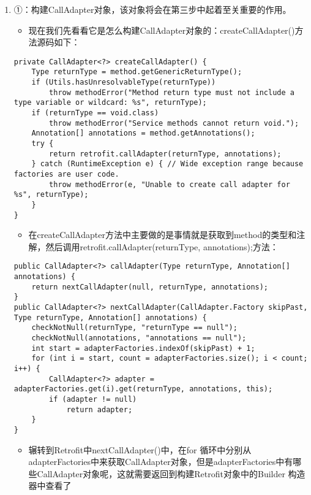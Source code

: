 \documentclass[9pt, b5paper]{article}
\begin{document}
\begin{enumerate}
\item ①：构建CallAdapter对象，该对象将会在第三步中起着至关重要的作用。
\label{sec-1-3-1-1}
\begin{itemize}
\item 现在我们先看看它是怎么构建CallAdapter对象的：createCallAdapter()方法源码如下：
\end{itemize}
\begin{verbatim}
private CallAdapter<?> createCallAdapter() {
    Type returnType = method.getGenericReturnType();
    if (Utils.hasUnresolvableType(returnType)) 
        throw methodError("Method return type must not include a type variable or wildcard: %s", returnType);
    if (returnType == void.class) 
        throw methodError("Service methods cannot return void.");
    Annotation[] annotations = method.getAnnotations();
    try {
        return retrofit.callAdapter(returnType, annotations);
    } catch (RuntimeException e) { // Wide exception range because factories are user code.
        throw methodError(e, "Unable to create call adapter for %s", returnType);
    }
}
\end{verbatim}
\begin{itemize}
\item 在createCallAdapter方法中主要做的是事情就是获取到method的类型和注解，然后调用retrofit.callAdapter(returnType, annotations);方法：
\end{itemize}
\begin{verbatim}
public CallAdapter<?> callAdapter(Type returnType, Annotation[] annotations) {
    return nextCallAdapter(null, returnType, annotations);
}
public CallAdapter<?> nextCallAdapter(CallAdapter.Factory skipPast, Type returnType, Annotation[] annotations) {
    checkNotNull(returnType, "returnType == null");
    checkNotNull(annotations, "annotations == null");
    int start = adapterFactories.indexOf(skipPast) + 1;
    for (int i = start, count = adapterFactories.size(); i < count; i++) {
        CallAdapter<?> adapter = adapterFactories.get(i).get(returnType, annotations, this);
        if (adapter != null) 
            return adapter;
    }
}
\end{verbatim}
\begin{itemize}
\item 辗转到Retrofit中nextCallAdapter()中，在for 循环中分别从adapterFactories中来获取CallAdapter对象，但是adapterFactories中有哪些CallAdapter对象呢，这就需要返回到构建Retrofit对象中的Builder 构造器中查看了

\end{itemize}
\end{enumerate}
\end{document}
